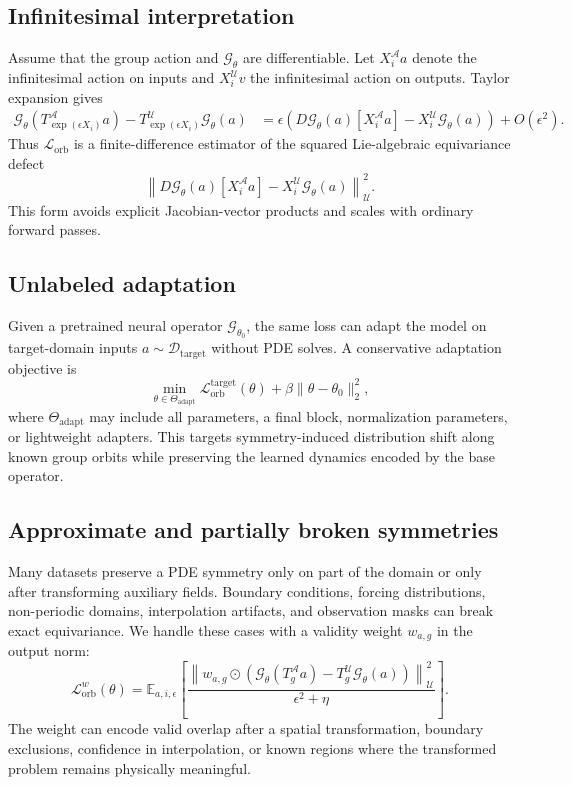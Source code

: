 \subsection{Infinitesimal interpretation}
Assume that the group action and \(\mathcal{G}_\theta\) are differentiable. Let \(X_i^{\mathcal{A}}a\) denote the infinitesimal action on inputs and \(X_i^{\mathcal{U}}v\) the infinitesimal action on outputs. Taylor expansion gives
\[
\begin{aligned}
    \mathcal{G}_\theta(T_{\exp(\epsilon X_i)}^{\mathcal{A}}a)
    -
    T_{\exp(\epsilon X_i)}^{\mathcal{U}}\mathcal{G}_\theta(a)
    & =
    \epsilon
    \left(
    D\mathcal{G}_\theta(a)[X_i^{\mathcal{A}}a]
    -
    X_i^{\mathcal{U}}\mathcal{G}_\theta(a)
    \right)
    + O(\epsilon^2).
\end{aligned}
\]
Thus \(\mathcal{L}_{\mathrm{orb}}\) is a finite-difference estimator of the squared Lie-algebraic equivariance defect
\[
    \left\|
    D\mathcal{G}_\theta(a)[X_i^{\mathcal{A}}a]
    -
    X_i^{\mathcal{U}}\mathcal{G}_\theta(a)
    \right\|_{\mathcal{U}}^2.
\]
This form avoids explicit Jacobian-vector products and scales with ordinary forward passes.

\subsection{Unlabeled adaptation}
Given a pretrained neural operator \(\mathcal{G}_{\theta_0}\), the same loss can adapt the model on target-domain inputs \(a\sim \mathcal{D}_{\mathrm{target}}\) without PDE solves. A conservative adaptation objective is
\[
    \min_{\theta\in\Theta_{\mathrm{adapt}}}
    \mathcal{L}_{\mathrm{orb}}^{\mathrm{target}}(\theta)
    +
    \beta\|\theta-\theta_0\|_2^2,
\]
where \(\Theta_{\mathrm{adapt}}\) may include all parameters, a final block, normalization parameters, or lightweight adapters. This targets symmetry-induced distribution shift along known group orbits while preserving the learned dynamics encoded by the base operator.

\subsection{Approximate and partially broken symmetries}
Many datasets preserve a PDE symmetry only on part of the domain or only after transforming auxiliary fields. Boundary conditions, forcing distributions, non-periodic domains, interpolation artifacts, and observation masks can break exact equivariance. We handle these cases with a validity weight \(w_{a,g}\) in the output norm:
\[
    \mathcal{L}_{\mathrm{orb}}^{w}(\theta)
    =
    \mathbb{E}_{a,i,\epsilon}
    \left[
    \frac{
    \left\|
    w_{a,g}\odot
    \left(
    \mathcal{G}_\theta(T_g^{\mathcal{A}}a)
    -
    T_g^{\mathcal{U}}\mathcal{G}_\theta(a)
    \right)
    \right\|_{\mathcal{U}}^2
    }{\epsilon^2+\eta}
    \right].
\]
The weight can encode valid overlap after a spatial transformation, boundary exclusions, confidence in interpolation, or known regions where the transformed problem remains physically meaningful.

